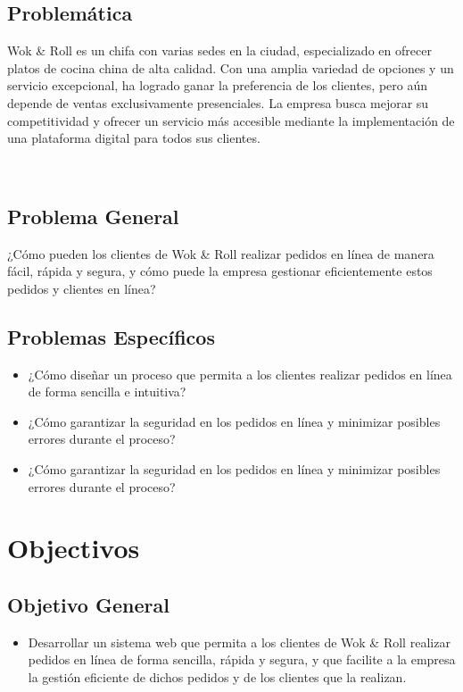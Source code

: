 \documentclass{article}
\begin{document}
\begin{doublespace}
    \subsection{Problemática}
    \noindent Wok \& Roll es un chifa con varias sedes en la ciudad, especializado en ofrecer
platos de cocina china de alta calidad. Con una amplia variedad de opciones y un servicio excepcional, ha logrado ganar la preferencia de los clientes, pero aún depende de ventas exclusivamente presenciales. La empresa busca mejorar su competitividad y ofrecer un servicio más accesible mediante la implementación de una plataforma digital para todos sus clientes.

    \\
    \subsection{Problema General}
    \noindent ¿Cómo pueden los clientes de Wok \& Roll realizar pedidos en línea de manera fácil, rápida y segura, y cómo puede la empresa gestionar eficientemente estos pedidos y clientes en línea?
    \\
    
    \subsection{Problemas Específicos}
    \begin{itemize}
        \item ¿Cómo diseñar un proceso que permita a los clientes realizar pedidos en línea de forma sencilla e intuitiva?
        \item ¿Cómo garantizar la seguridad en los pedidos en línea y minimizar posibles errores durante el proceso?
        \item ¿Cómo garantizar la seguridad en los pedidos en línea y minimizar posibles errores durante el proceso?
    \end{itemize}

    \section{Objectivos}
    \subsection{Objetivo General}
    \begin{itemize}
        \item Desarrollar un sistema web que permita a los clientes de Wok \& Roll realizar pedidos en línea de forma sencilla, rápida y segura, y que facilite a la empresa la gestión eficiente de dichos pedidos y de los clientes que la realizan.
    \end{itemize}

\end{doublespace}
\end{document}
